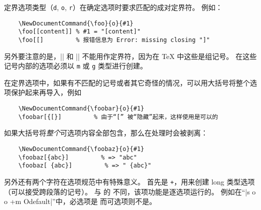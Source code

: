 \documentclass{l3doc}
\begin{document}
定界选项类型（\texttt{d}, \texttt{o}, \texttt{r}）在确定选项时要求匹配的成对定界符。
例如：
\begin{verbatim}
    \NewDocumentCommand{\foo}{o}{#1}
    \foo[[content]] % #1 = "[content]"
    \foo[[]         % 报错信息为 Error: missing closing "]"
\end{verbatim}
%
另外要注意的是，|{| 和 |}| 不能用作定界符，因为在 \TeX{} 中这些是组记号。
在这些记号内部的选项必须以 \texttt{m} 或 \texttt{g} 类型进行创建。

在定界选项中，如果有不匹配的记号或者其它奇怪的情况，可以用大括号将整个选项保护起来再导入，例如
\begin{verbatim}
    \NewDocumentCommand{\foobar}{o}{#1}
    \foobar[{[}]         % 由于“[” 被“隐藏”起来，这样使用是可以的
\end{verbatim}
%
如果大括号将\emph{整个}可选项内容全部包含，那么在处理时会被剥离：
\begin{verbatim}
    \NewDocumentCommand{\foobaz}{o}{#1}
    \foobaz[{abc}]         % => "abc"
    \foobaz[ {abc}]         % => " {abc}"
\end{verbatim}

%
另外还有两个字符在选项规范中有特殊意义。
首先是 \texttt{+}，用来创建 long 类型选项（可以接受跨段落的记号）。
与 \LaTeXe{} 的  不同，该项功能是逐选项运行的。
例如在“|s o o +m O{default}|”中，必选项是  而可选项则不是。
\end{document}
